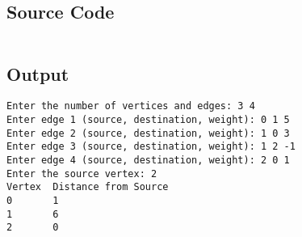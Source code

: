\documentclass{korigamik}
\begin{document}
\subsection{Source Code}
\inputminted[firstline=6, lastline=55]{cpp}{code/bellmanford.cpp}

\subsection{Output}
\begin{lstlisting}[style=output]
Enter the number of vertices and edges: 3 4
Enter edge 1 (source, destination, weight): 0 1 5
Enter edge 2 (source, destination, weight): 1 0 3
Enter edge 3 (source, destination, weight): 1 2 -1
Enter edge 4 (source, destination, weight): 2 0 1
Enter the source vertex: 2
Vertex  Distance from Source
0       1
1       6
2       0
\end{lstlisting}
\end{document}
